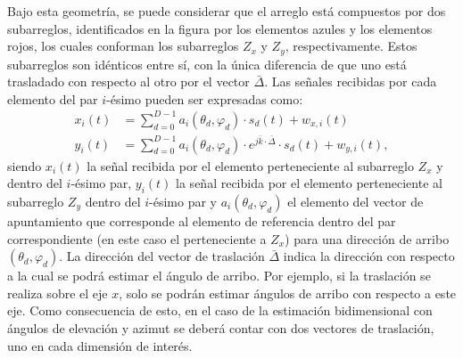 Bajo esta geometría, se puede considerar que el arreglo está compuestos por dos subarreglos, identificados en la figura por los elementos azules y los elementos rojos, los cuales conforman los subarreglos $Z_x$ y $Z_y$, respectivamente. Estos subarreglos son idénticos entre sí, con la única diferencia de que uno está trasladado con respecto al otro por el vector $\bar{\Delta}$. Las señales recibidas por cada elemento del par $i$-ésimo pueden ser expresadas como:
\begin{equation}
    \begin{split}
        x_i(t)&=\sum_{d=0}^{D-1} a_i(\theta_d,\varphi_d)\cdot s_d(t) + w_{x,i}(t)\\
        y_i(t)&=\sum_{d=0}^{D-1} a_i(\theta_d,\varphi_d)\cdot e^{j\bar{k}\cdot\bar{\Delta}}\cdot s_d(t) + w_{y,i}(t),
    \end{split}
\end{equation}
siendo $x_i(t)$ la señal recibida por el elemento perteneciente al subarreglo $Z_x$ y dentro del $i$-ésimo par, $y_i(t)$ la señal recibida por el elemento perteneciente al subarreglo $Z_y$ dentro del $i$-ésimo par y $a_i(\theta_d,\varphi_d)$ el elemento del vector de apuntamiento que corresponde al elemento de referencia dentro del par correspondiente (en este caso el perteneciente a $Z_x$) para una dirección de arribo $(\theta_d,\varphi_d)$. La dirección del vector de traslación $\bar{\Delta}$ indica la dirección con respecto a la cual se podrá estimar el ángulo de arribo. Por ejemplo, si la traslación se realiza sobre el eje $x$, solo se podrán estimar ángulos de arribo con respecto a este eje. Como consecuencia de esto, en el caso de la estimación bidimensional con ángulos de elevación y azimut se deberá contar con dos vectores de traslación, uno en cada dimensión de interés.

